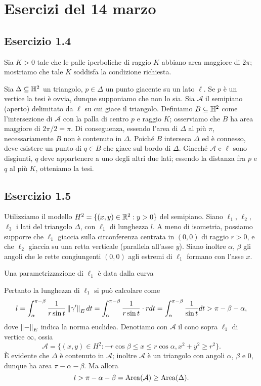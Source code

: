 \section*{Esercizi del 14 marzo}

\subsection*{Esercizio 1.4}
Sia $K>0$ tale che le palle iperboliche di raggio $K$ abbiano area maggiore di $2\pi$; mostriamo che tale $K$ soddisfa la condizione richiesta.

Sia $\Delta\subseteq\mathbb{H}^2$ un triangolo, $p\in\Delta$ un punto giacente su un lato $\ell$. Se $p$ è un vertice la tesi è ovvia, dunque supponiamo che non lo sia. Sia $\mathcal{A}$ il semipiano (aperto) delimitato da $\ell$ su cui giace il triangolo. Definiamo $B\subseteq\mathbb{H}^2$ come l'intersezione di $\mathcal{A}$ con la palla di centro $p$ e raggio $K$; osserviamo che $B$ ha area maggiore di $2\pi/2=\pi$. Di conseguenza, essendo l'area di $\Delta$ al più $\pi$, necessariamente $B$ non è contenuto in $\Delta$. Poiché $B$ interseca $\Delta$ ed è connesso, deve esistere un punto di $q\in B$ che giace sul bordo di $\Delta$. Giacché $\mathcal{A}$ e $\ell$ sono disgiunti, $q$ deve appartenere a uno degli altri due lati; essendo la distanza fra $p$ e $q$ al più $K$, otteniamo la tesi.

\subsection*{Esercizio 1.5}
Utilizziamo il modello $H^2=\{(x,y)\in\mathbb{R}^2:y>0\}$ del semipiano.
Siano $\ell_1$, $\ell_2$, $\ell_3$ i lati del triangolo $\Delta$, con $\ell_1$ di lunghezza $l$. A meno di isometria, possiamo supporre che $\ell_1$ giaccia sulla circonferenza centrata in $(0,0)$ di raggio $r>0$, e che $\ell_2$ giaccia su una retta verticale (parallela all'asse $y$). Siano inoltre $\alpha$, $\beta$ gli angoli che le rette congiungenti $(0,0)$ agli estremi di $\ell_1$ formano con l'asse $x$.

Una parametrizzazione di $\ell_1$ è data dalla curva

Pertanto la lunghezza di $\ell_1$ si può calcolare come
\[
l=\int_\alpha^{\pi-\beta}\frac{1}{r\sin t}\left\lVert\gamma'\right\rVert_Edt=\int_\alpha^{\pi-\beta}\frac{1}{r\sin t}\cdot rdt=\int_\alpha^{\pi-\beta}\frac{1}{\sin t}dt>\pi-\beta-\alpha,
\]
dove $\left\lVert-\right\rVert_E$ indica la norma euclidea. Denotiamo con $\mathcal{A}$ il cono sopra $\ell_1$ di vertice $\infty$, ossia
\[
\mathcal{A}=\{(x,y)\in H^2:-r\cos\beta\le x\le r\cos\alpha,x^2+y^2\ge r^2\}.
\]
È evidente che $\Delta$ è contenuto in $\mathcal{A}$; inoltre $\mathcal{A}$ è un triangolo con angoli $\alpha$, $\beta$ e $0$, dunque ha area $\pi-\alpha-\beta$. Ma allora
\[
l>\pi-\alpha-\beta=\operatorname{Area}(\mathcal{A})\ge\operatorname{Area}(\Delta).
\]


